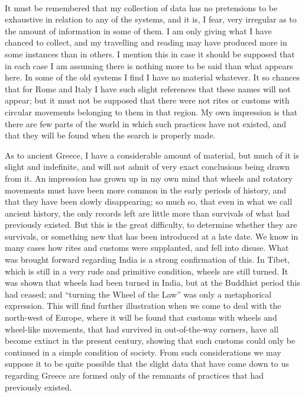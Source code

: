 \documentclass[a4paper, 11pt, oneside, polutonikogreek, english]{article}
\begin{document}
\paragraph{}
It must be remembered that my collection of data has no pretensions to be exhaustive in relation to any of the systems, and it is, I fear, very irregular as to the amount of information in some of them. I am only giving what I have chanced to collect, and my travelling and reading may have produced more in some instances than in others. I mention this in case it should be supposed that in each case I am assuming there is nothing more to be said than what appears here. In some of the old systems I find I have no material whatever. It so chances that for Rome and Italy I have such slight references that these names will not appear; but it must not be supposed that there were not rites or customs with circular movements belonging to them in that region. My own impression is that there are few parts of the world in which such practices have not existed, and that they will be found when the search is properly made.

As to ancient Greece, I have a considerable amount of material, but much of it is slight and indefinite, and will not admit of very exact conclusions being drawn from it. An impression has grown up in my own mind that wheels and rotatory movements must have been more common in the early periods of history, and that they have been slowly disappearing; so much so, that even in what we call ancient history, the only records left are little more than survivals of what had previously existed. But this is the great difficulty, to determine whether they are survivals, or something new that has been introduced at a late date. We know in many cases how rites and customs were supplanted, and fell into disuse. What was brought forward regarding India is a strong confirmation of this. In Tibet, which is still in a very rude and primitive condition, wheels are still turned. It was shown that wheels had been turned in India, but at the Buddhist period this had ceased; and ``turning the Wheel of the Law'' was only a metaphorical expression. This will find further illustration when we come to deal with the north-west of Europe, where it will be found that customs with wheels and wheel-like movements, that had survived in out-of-the-way corners, have all become extinct in the present century, showing that such customs could only be continued in a simple condition of society. From such considerations we may suppose it to be quite possible that the slight data that have come down to us regarding Greece are formed only of the remnants of practices that had previously existed.
\end{document}
